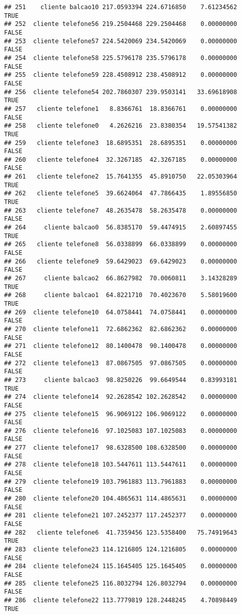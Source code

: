 \documentclass[
]{article}
\begin{document}
\begin{verbatim}
## 251    cliente balcao10 217.0593394 224.6716850    7.61234562     TRUE
## 252  cliente telefone56 219.2504468 229.2504468    0.00000000    FALSE
## 253  cliente telefone57 224.5420069 234.5420069    0.00000000    FALSE
## 254  cliente telefone58 225.5796178 235.5796178    0.00000000    FALSE
## 255  cliente telefone59 228.4508912 238.4508912    0.00000000    FALSE
## 256  cliente telefone54 202.7860307 239.9503141   33.69618908     TRUE
## 257   cliente telefone1   8.8366761  18.8366761    0.00000000    FALSE
## 258   cliente telefone0   4.2626216  23.8380354   19.57541382     TRUE
## 259   cliente telefone3  18.6895351  28.6895351    0.00000000    FALSE
## 260   cliente telefone4  32.3267185  42.3267185    0.00000000    FALSE
## 261   cliente telefone2  15.7641355  45.8910750   22.05303964     TRUE
## 262   cliente telefone5  39.6624064  47.7866435    1.89556850     TRUE
## 263   cliente telefone7  48.2635478  58.2635478    0.00000000    FALSE
## 264     cliente balcao0  56.8385170  59.4474915    2.60897455     TRUE
## 265   cliente telefone8  56.0338899  66.0338899    0.00000000    FALSE
## 266   cliente telefone9  59.6429023  69.6429023    0.00000000    FALSE
## 267     cliente balcao2  66.8627982  70.0060811    3.14328289     TRUE
## 268     cliente balcao1  64.8221710  70.4023670    5.58019600     TRUE
## 269  cliente telefone10  64.0758441  74.0758441    0.00000000    FALSE
## 270  cliente telefone11  72.6862362  82.6862362    0.00000000    FALSE
## 271  cliente telefone12  80.1400478  90.1400478    0.00000000    FALSE
## 272  cliente telefone13  87.0867505  97.0867505    0.00000000    FALSE
## 273     cliente balcao3  98.8250226  99.6649544    0.83993181     TRUE
## 274  cliente telefone14  92.2628542 102.2628542    0.00000000    FALSE
## 275  cliente telefone15  96.9069122 106.9069122    0.00000000    FALSE
## 276  cliente telefone16  97.1025083 107.1025083    0.00000000    FALSE
## 277  cliente telefone17  98.6328500 108.6328500    0.00000000    FALSE
## 278  cliente telefone18 103.5447611 113.5447611    0.00000000    FALSE
## 279  cliente telefone19 103.7961883 113.7961883    0.00000000    FALSE
## 280  cliente telefone20 104.4865631 114.4865631    0.00000000    FALSE
## 281  cliente telefone21 107.2452377 117.2452377    0.00000000    FALSE
## 282   cliente telefone6  41.7359456 123.5358400   75.74919643     TRUE
## 283  cliente telefone23 114.1216805 124.1216805    0.00000000    FALSE
## 284  cliente telefone24 115.1645405 125.1645405    0.00000000    FALSE
## 285  cliente telefone25 116.8032794 126.8032794    0.00000000    FALSE
## 286  cliente telefone22 113.7779819 128.2448245    4.70898449     TRUE

\end{verbatim}
\end{document}
